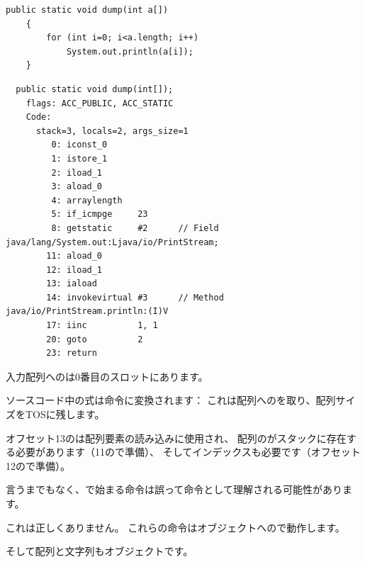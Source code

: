 \begin{lstlisting}[style=customjava]
	public static void dump(int a[])
	{
		for (int i=0; i<a.length; i++)
			System.out.println(a[i]);
	}
\end{lstlisting}

\begin{lstlisting}
  public static void dump(int[]);
    flags: ACC_PUBLIC, ACC_STATIC
    Code:
      stack=3, locals=2, args_size=1
         0: iconst_0      
         1: istore_1      
         2: iload_1       
         3: aload_0       
         4: arraylength   
         5: if_icmpge     23
         8: getstatic     #2      // Field java/lang/System.out:Ljava/io/PrintStream;
        11: aload_0       
        12: iload_1       
        13: iaload        
        14: invokevirtual #3      // Method java/io/PrintStream.println:(I)V
        17: iinc          1, 1
        20: goto          2
        23: return        
\end{lstlisting}

入力配列へのは0番目のスロットにあります。

ソースコード中の式は命令に変換されます：
これは配列へのを取り、配列サイズを\ac{TOS}に残します。

オフセット13のは配列要素の読み込みに使用され、
配列のがスタックに存在する必要があります（11ので準備）、
そしてインデックスも必要です（オフセット12ので準備）。

言うまでもなく、で始まる命令は誤って命令として理解される可能性があります。

これは正しくありません。
これらの命令はオブジェクトへので動作します。

そして配列と文字列もオブジェクトです。
